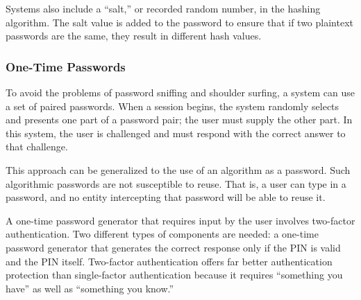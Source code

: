 Systems also include a ``salt,'' or recorded random number, in the hashing algorithm.
The salt value is added to the password to ensure that if two plaintext passwords are the same, they result in different hash values.

\subsubsection{One-Time Passwords}\label{subsubsec:One_Time_Passwords}
To avoid the problems of password sniffing and shoulder surfing, a system can use a set of paired passwords.
When a session begins, the system randomly selects and presents one part of a password pair; the user must supply the other part.
In this system, the user is challenged and must respond with the correct answer to that challenge.

This approach can be generalized to the use of an algorithm as a password.
Such algorithmic passwords are not susceptible to reuse.
That is, a user can type in a password, and no entity intercepting that password will be able to reuse it.

A one-time password generator that requires input by the user involves two-factor authentication.
Two different types of components are needed: a one-time password generator that generates the correct response only if the PIN is valid and the PIN itself.
Two-factor authentication offers far better authentication protection than single-factor authentication because it requires ``something you have'' as well as ``something you know.''

